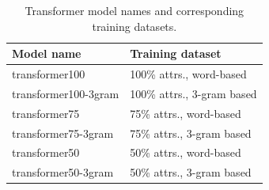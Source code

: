 \begin{table}[!th]
	\centering
	\begin{tabularx}{0.8\textwidth}{|l|X|}
		\hline
		\textbf{Model name} & \textbf{Training dataset} \\ \hline
		transformer100 & 100\% attrs., word-based \\
		transformer100-3gram & 100\% attrs., 3-gram based \\ 
		transformer75 & 75\% attrs., word-based \\
		transformer75-3gram & 75\% attrs., 3-gram based \\ 
		transformer50 & 50\% attrs., word-based \\
		transformer50-3gram & 50\% attrs., 3-gram based \\ 
		\hline
	\end{tabularx}
	\caption{Transformer model names and corresponding training datasets.}
	\label{tab:trained_transformer_models}
\end{table}


